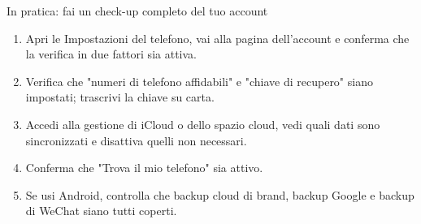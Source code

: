 \begin{tcbpractice}{In pratica: fai un check-up completo del tuo account}
\begin{enumerate}
  \item Apri le Impostazioni del telefono, vai alla pagina dell'account e conferma che la verifica in due fattori sia attiva.
  \item Verifica che "numeri di telefono affidabili" e "chiave di recupero" siano impostati; trascrivi la chiave su carta.
  \item Accedi alla gestione di iCloud o dello spazio cloud, vedi quali dati sono sincronizzati e disattiva quelli non necessari.
  \item Conferma che "Trova il mio telefono" sia attivo.
  \item Se usi Android, controlla che backup cloud di brand, backup Google e backup di WeChat siano tutti coperti.
\end{enumerate}

\end{tcbpractice}
